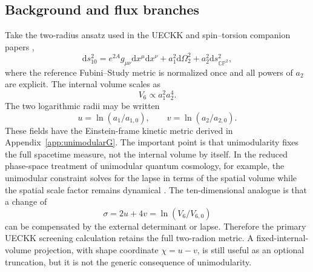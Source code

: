 \documentclass[11pt,a4paper]{article}
\newcommand{\dd}{\mathrm d}
\newcommand{\CP}{\mathbb{CP}}
\begin{document}
\subsection{Background and flux branches}
Take the two-radius ansatz used in the UECKK and spin--torsion companion papers \cite{ShayaUECKK2026,ShayaVacuum2026},
\begin{equation}
\dd s_{10}^2=e^{2A}g_{\mu\nu}\dd x^\mu\dd x^\nu+a_1^2\dd\Omega_2^2+a_2^2\dd s_{\CP^2}^2,
\end{equation}
where the reference Fubini--Study metric is normalized once and all powers of $a_2$ are explicit. The internal volume scales as
\begin{equation}
V_6\propto a_1^2a_2^4.
\end{equation}
The two logarithmic radii may be written
\begin{equation}
u=\ln(a_1/a_{1,0}),\qquad v=\ln(a_2/a_{2,0}).
\end{equation}
These fields have the Einstein-frame kinetic metric derived in Appendix~\ref{app:unimodularG}. The important point is that unimodularity fixes the full spacetime measure, not the internal volume by itself. In the reduced phase-space treatment of unimodular quantum cosmology, for example, the unimodular constraint solves for the lapse in terms of the spatial volume while the spatial scale factor remains dynamical \cite{Yamashita2026UnimodularQC}. The ten-dimensional analogue is that a change of
\begin{equation}
\sigma=2u+4v=\ln(V_6/V_{6,0})
\end{equation}
can be compensated by the external determinant or lapse. Therefore the primary UECKK screening calculation retains the full two-radion metric. A fixed-internal-volume projection, with shape coordinate \(\chi=u-v\), is still useful as an optional truncation, but it is not the generic consequence of unimodularity.
\end{document}

